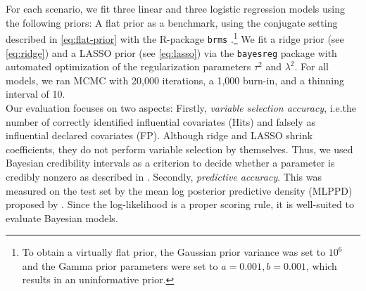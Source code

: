 For each scenario, we fit three linear and three logistic regression models using the following priors: A flat prior as a benchmark, using the conjugate setting described in \autoref{eq:flat-prior} with the R-package \texttt{brms} \citep{brms_2017}.\footnote{To obtain a virtually flat prior, the Gaussian prior variance was set to $10^6$ and the Gamma prior parameters were set to $a = 0.001, b=0.001$, which results in an uninformative prior.} 
We fit a ridge prior (see \autoref{eq:ridge}) and a LASSO prior (see \autoref{eq:lasso}) via the \texttt{bayesreg} package \citep{makalic_bayesreg_2016} with automated optimization of the regularization parameters $\tau^2$ and $\lambda^2$.
For all models, we ran MCMC with 20,000 iterations, a 1,000 burn-in, and a thinning interval of 10.\\

Our evaluation focuses on two aspects:
Firstly, \textit{variable selection accuracy}, i.e.\@ the number of correctly identified influential covariates (Hits) and falsely as influential declared covariates (FP).
Although ridge and LASSO shrink coefficients, they do not perform variable selection by themselves.
Thus, we used Bayesian credibility intervals as a criterion to decide whether a parameter is credibly nonzero as described in \citet{van_erp_shrinkage_2019}.
Secondly, \textit{predictive accuracy}.
This was measured on the test set by the mean log posterior predictive density (MLPPD) proposed by \citet{gelman_understanding_2013}.
Since the log-likelihood is a proper scoring rule, it is well-suited to evaluate Bayesian models.\\

